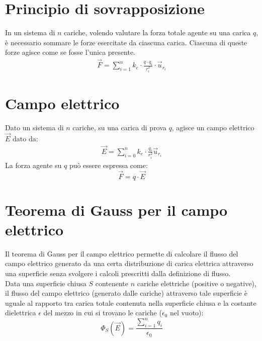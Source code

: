 \section{Principio di sovrapposizione}
In un sistema di $n$ cariche, volendo valutare la forza totale agente su una carica $q$, è necessario sommare le forze esercitate da ciascuna carica. Ciascuna di queste forze agisce come se fosse l'unica presente.
	\begin{displaymath}\begin{aligned}
		\vec{F} = \sum_{i=1}^n k_e \cdot \frac{q \cdot q_i}{r_i^2} \cdot \vec{u}_{r_i}
	\end{aligned}\end{displaymath}

\section{Campo elettrico}
Dato un sistema di $n$ cariche, su una carica di prova $q$, agisce un campo elettrico $\vec{E}$ dato da:
	\begin{displaymath}\begin{aligned}
		\vec{E} = \sum_{i=0}^n k_e \cdot \frac{q_i}{r_i^2}\vec{u}_{r_i}
	\end{aligned}\end{displaymath}
La forza agente su $q$ può essere espressa come:
	\begin{displaymath}
		\vec{F} = q \cdot \vec{E}
	\end{displaymath}
    
\section{Teorema di Gauss per il campo elettrico}
Il teorema di Gauss per il campo elettrico permette di calcolare il flusso del campo elettrico generato da una certa distribuzione di carica elettrica attraverso una superficie senza svolgere i calcoli prescritti dalla definizione di flusso.\\
Data una superficie chiusa $S$ contenente $n$ cariche elettriche (positive o negative), il flusso del campo elettrico (generato dalle cariche) attraverso tale superficie è uguale al rapporto tra carica totale contenuta nella superficie chiusa e la costante dielettrica $\epsilon$ del mezzo in cui si trovano le cariche ($\epsilon_0$ nel vuoto):
\begin{displaymath}
	\Phi_S(\vec{E}) = \frac{\sum_{i=1}^n q_i}{\epsilon_0}
\end{displaymath}

